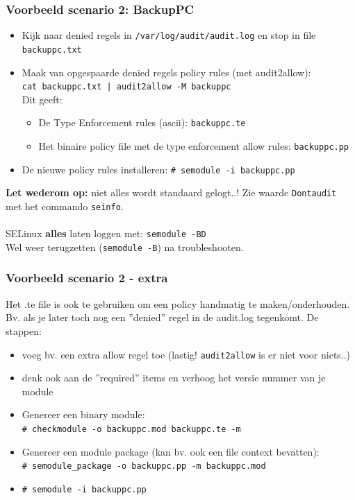 \begin{frame}
    \frametitle{Voorbeeld scenario 2: BackupPC}
\begin{itemize}
\item Kijk naar denied regels in {\tt /var/log/audit/audit.log} en stop in file {\tt backuppc.txt}
\pause
\item Maak van opgespaarde denied regels policy rules (met audit2allow): \\
\footnotesize
{\tt cat backuppc.txt  | audit2allow -M backuppc} \\
\pause
Dit geeft:
	\begin{itemize}
	\item De Type Enforcement rules (ascii): {\tt backuppc.te}
	\pause
	\item Het binaire policy file met de type enforcement allow rules: {\tt backuppc.pp}
	\end{itemize}
\pause
\item De nieuwe policy rules installeren: {\tt \# semodule -i backuppc.pp}
\end{itemize}
\pause
{\bf Let wederom op:} niet alles wordt standaard gelogt..! Zie waarde {\tt Dontaudit} met het commando {\tt seinfo}. \\
~\\
SELinux {\bf alles} laten loggen met: {\tt semodule -BD} \\
Wel weer terugzetten ({\tt semodule -B}) na troubleshooten.
\end{frame}

\begin{frame}
    \frametitle{Voorbeeld scenario 2 - extra}
Het .te file is ook te gebruiken om een policy handmatig te maken/onderhouden. Bv. als je later toch nog een
''denied'' regel in de audit.log tegenkomt. De stappen:
\pause
\begin{itemize} 
\item voeg bv. een extra allow regel toe (lastig! {\tt audit2allow} is er niet voor niets..)
\pause
\item denk ook aan de ''required'' items en verhoog het versie nummer van je module
\pause
\item Genereer een binary module: \\ 
{\scriptsize {\tt \# checkmodule -o backuppc.mod backuppc.te -m}} \\
\pause
\item Genereer een module package (kan bv. ook een file context bevatten): \\
{\scriptsize {\tt \# semodule\_package -o backuppc.pp -m backuppc.mod}}
\pause
\item {\tt \# semodule -i backuppc.pp}
\end{itemize}
\end{frame}

